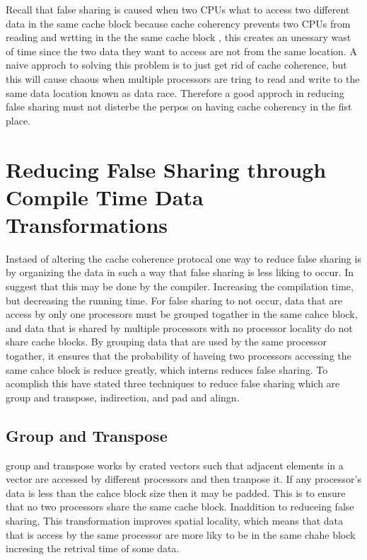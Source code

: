 Recall that false sharing is caused when two CPUs what to access two different data in the same cache block because cache coherency prevents two CPUs from reading and wrtting in the the same cache block
, this creates an unessary wast of time since the two data they want to access are not from the same location.
A naive approch to solving this problem is to just get rid of cache coherence,
 but this will cause chaous when multiple processors are tring to read and write to the same data location known as data race. Therefore a good approch in reducing false sharing must not disterbe the perpos on having cache coherency in the fist place.

\section{Reducing False Sharing through Compile Time Data Transformations}

Instaed of altering the cache coherence protocal one way to reduce false sharing is by organizing the data in such a way that false sharing is less liking to occur.
In \citealp{jeremiassen1995reducing} suggest that this may be done by the compiler. Increasing the compilation time, but decreasing the running time.
For false sharing to not occur, data that are access by only one processors must be grouped togather in the same cahce block, and data that is shared by multiple processors with no processor locality do not share cache blocks.
By grouping data that are used by the same processor togather, it ensures that the probability of haveing two processors accessing the same cahce block is reduce greatly, which interns reduces false sharing.
To acomplish this \citealp*{jeremiassen1995reducing} have stated three techniques to reduce false sharing which are group and transpose, indirection, and pad and alingn.

\subsection*{Group and Transpose}
group and transpose works by crated vectors such that adjacent elements in a vector are accessed by different processors and then tranpose it.
If any processor's data is less than the cahce block size then it may be padded.
This is to ensure that no two processors share the same cache block.
Inaddition to reduceing false sharing, This transformation improves spatial locality,
which means that data that is access by the same processor are more liky to be in the same chahe block incresing the retrival time of some data.

